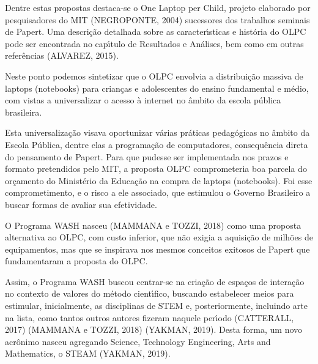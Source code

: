 \documentclass[
12pt,		%
openright,	%
twoside,  %
a4paper,			%
chapter=TITLE,		%
english,			%
french,				%
spanish,			%
brazil				%
]{USPSC-classe/USPSC}
\begin{document}
Dentre estas propostas destaca-se o \textquotedbl One Laptop per Child\textquotedbl , projeto elaborado por pesquisadores do MIT  (NEGROPONTE, 2004)  sucessores dos trabalhos seminais de Papert. Uma descri\c{c}\~ao detalhada sobre as caracter\'{\i}sticas e hist\'oria do OLPC pode ser encontrada no cap\'{\i}tulo de Resultados e An\'alises, bem como em outras refer\^encias  (ALVAREZ, 2015).









Neste ponto podemos sintetizar que o OLPC envolvia a distribui\c{c}\~ao massiva de laptops (notebooks) para crian\c{c}as e adolescentes do  ensino fundamental e m\'edio, com vistas a universalizar o acesso \`a internet no \^ambito da escola p\'ublica brasileira.









Esta universaliza\c{c}\~ao visava oportunizar v\'arias pr\'aticas pedag\'ogicas no \^ambito da Escola P\'ublica, dentre elas a programa\c{c}\~ao de computadores, consequ\^encia direta do pensamento de Papert. Para que pudesse ser implementada nos prazos e formato pretendidos pelo MIT, a proposta OLPC comprometeria boa parcela do or\c{c}amento do Minist\'erio da Educa\c{c}\~ao na compra de laptops (notebooks). Foi esse comprometimento, e o risco a ele associado, que estimulou o Governo Brasileiro a buscar formas de avaliar sua efetividade.









O Programa WASH nasceu  (MAMMANA e TOZZI, 2018)  como uma proposta alternativa ao OLPC, com custo inferior, que n\~ao exigia a aquisi\c{c}\~ao de milh\~oes de equipamentos, mas que se inspirava nos mesmos conceitos exitosos de Papert que fundamentaram a proposta do OLPC.









Assim, o Programa WASH buscou centrar-se na cria\c{c}\~ao de espa\c{c}os de intera\c{c}\~ao no contexto de valores do m\'etodo cient\'{\i}fico, buscando estabelecer meios para estimular, inicialmente, as disciplinas de STEM e, posteriormente, incluindo arte na lista, como tantos outros autores fizeram naquele per\'{\i}odo  (CATTERALL, 2017) (MAMMANA e TOZZI, 2018)  (YAKMAN, 2019). Desta forma, um novo acr\^onimo nasceu agregando Science, Technology Engineering, Arts and Mathematics, o STEAM  (YAKMAN, 2019).
\end{document}
